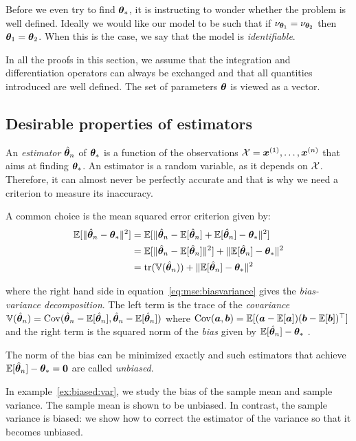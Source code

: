 Before we even try to find $\boldsymbol{\theta}_*$, it is instructing to wonder whether the
problem is well defined. Ideally we would like our model to be such that if
$\nu_{\boldsymbol{\theta}_1} = \nu_{\boldsymbol{\theta}_2}$ then $\boldsymbol{\theta}_1=\boldsymbol{\theta}_2$.
When this is the case, we say that the model is \emph{identifiable}.

In all the proofs in this section, we assume that the integration and
differentiation operators can always be exchanged and that all quantities
introduced are well defined. The set of parameters $\boldsymbol{\theta}$ is viewed as a
vector.

\subsection{Desirable properties of estimators}
\label{sec:desirable}
An \emph{estimator} $\hat{\boldsymbol{\theta}}_n$ of $\boldsymbol{\theta}_*$ is a function of the
observations $\mathcal{X} = \boldsymbol{x}^{(1)}, \dots, \boldsymbol{x}^{(n)}$ that aims at finding $\boldsymbol{\theta}_*$.
An estimator is a random variable, as it depends on $\mathcal{X}$. Therefore, it can almost never be perfectly accurate and that
is why we need a criterion to measure its inaccuracy.

A common choice is the mean squared error criterion given by:
\begin{align}
  \mathbb{E}[\|\hat{\boldsymbol{\theta}}_n - \boldsymbol{\theta}_*\|^2] &= \mathbb{E}[\|\hat{\boldsymbol{\theta}}_n - \mathbb{E}[\hat{\boldsymbol{\theta}}_n] + \mathbb{E}[\hat{\boldsymbol{\theta}}_n] - \boldsymbol{\theta}_*\|^2] \\
                                   &= \mathbb{E}[\|\hat{\boldsymbol{\theta}}_n - \mathbb{E}[\hat{\boldsymbol{\theta}}_n]\|^2] + \|\mathbb{E}[\hat{\boldsymbol{\theta}}_n] - \boldsymbol{\theta}_*\|^2  \\
                                         &= \mathop{\mathrm{tr}}(\mathbb{V}(\hat{\boldsymbol{\theta}}_n)) + \|\mathbb{E}[\hat{\boldsymbol{\theta}}_n] - \boldsymbol{\theta}_*\|^2 \label{eq:mse:biasvariance}
\end{align}

where the right hand side in equation~\ref{eq:mse:biasvariance} gives the
\emph{bias-variance decomposition}. The left term is the trace of the \emph{covariance} $\mathbb{V}(\hat{\boldsymbol{\theta}}_n) = \operatorname*{Cov}(\hat{\boldsymbol{\theta}}_n -
\mathbb{E}[\hat{\boldsymbol{\theta}}_n], \hat{\boldsymbol{\theta}}_n -
\mathbb{E}[\hat{\boldsymbol{\theta}}_n])$ where $\operatorname*{Cov}(\boldsymbol{a}, \boldsymbol{b}) = \mathbb{E}[(\boldsymbol{a} - \mathbb{E}[\boldsymbol{a}]) (\boldsymbol{b} -
\mathbb{E}[\boldsymbol{b}])^{\top}]$ and the right term is the squared norm of the \emph{bias} given by $\mathbb{E}[\hat{\boldsymbol{\theta}}_n] - \boldsymbol{\theta}_*$ .

The norm of the bias can be minimized exactly and such estimators that achieve $\mathbb{E}[\hat{\boldsymbol{\theta}}_n] - \boldsymbol{\theta}_* = \boldsymbol{0}$ are called \emph{unbiased}.

In example~\ref{ex:biased:var}, we study the bias of the sample mean and sample variance. The sample mean is shown to be unbiased. In
contrast, the sample variance is biased: we show how to
correct the estimator of the variance so that it becomes unbiased.

